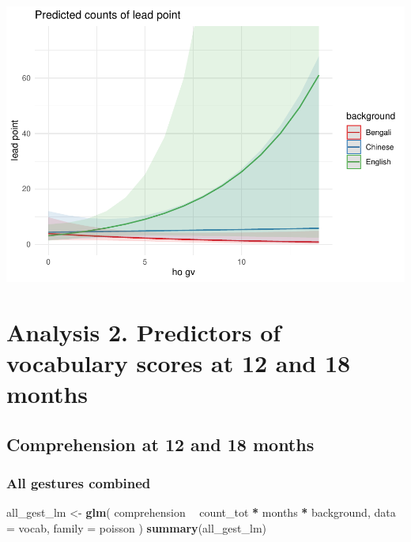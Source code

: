 \documentclass[]{article}
\newenvironment{Shaded}{\begin{snugshade}}{\end{snugshade}}
\newcommand{\DataTypeTok}[1]{\textcolor[rgb]{0.13,0.29,0.53}{#1}}
\newcommand{\KeywordTok}[1]{\textcolor[rgb]{0.13,0.29,0.53}{\textbf{#1}}}
\newcommand{\NormalTok}[1]{#1}
\newcommand{\OperatorTok}[1]{\textcolor[rgb]{0.81,0.36,0.00}{\textbf{#1}}}
\newcommand{\StringTok}[1]{\textcolor[rgb]{0.31,0.60,0.02}{#1}}
\begin{document}
\includegraphics{supplement_files/figure-latex/hg-point-plot-1.pdf}

\newpage

\hypertarget{analysis-2.-predictors-of-vocabulary-scores-at-12-and-18-months}{%
\section{Analysis 2. Predictors of vocabulary scores at 12 and 18
months}\label{analysis-2.-predictors-of-vocabulary-scores-at-12-and-18-months}}

\hypertarget{comprehension-at-12-and-18-months}{%
\subsection{Comprehension at 12 and 18
months}\label{comprehension-at-12-and-18-months}}

\hypertarget{all-gestures-combined}{%
\subsubsection{All gestures combined}\label{all-gestures-combined}}

\begin{Shaded}
\begin{Highlighting}[]
\NormalTok{all_gest_lm <-}\StringTok{ }\KeywordTok{glm}\NormalTok{(}
\NormalTok{  comprehension }\OperatorTok{~}
\StringTok{    }\NormalTok{count_tot }\OperatorTok{*}
\StringTok{    }\NormalTok{months }\OperatorTok{*}
\StringTok{    }\NormalTok{background,}
  \DataTypeTok{data =}\NormalTok{ vocab,}
  \DataTypeTok{family =}\NormalTok{ poisson}
\NormalTok{)}
\KeywordTok{summary}\NormalTok{(all_gest_lm)}
\end{Highlighting}
\end{Shaded}
\end{document}

